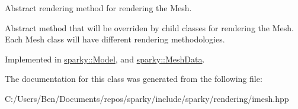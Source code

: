 Abstract rendering method for rendering the Mesh. 

Abstract method that will be overriden by child classes for rendering the Mesh. Each Mesh class will have different rendering methodologies. 

Implemented in \hyperlink{classsparky_1_1_model_a0c0610085b029e33351d3d61a76bc92b}{sparky\+::\+Model}, and \hyperlink{classsparky_1_1_mesh_data_a38c127564baa1fb1f3e690d5afe3246c}{sparky\+::\+Mesh\+Data}.



The documentation for this class was generated from the following file\+:\begin{DoxyCompactItemize}
\item 
C\+:/\+Users/\+Ben/\+Documents/repos/sparky/include/sparky/rendering/imesh.\+hpp\end{DoxyCompactItemize}
